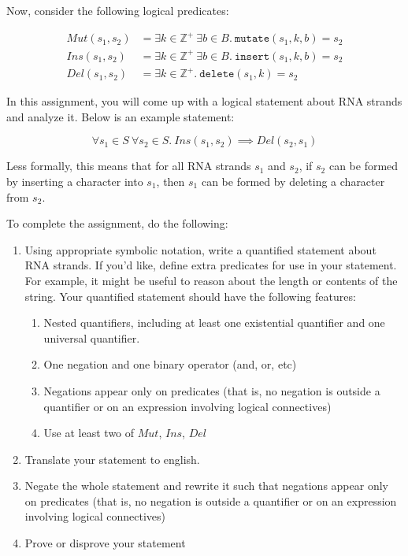 \documentclass[12pt]{article}
\begin{document}
Now, consider the following logical predicates:

\begin{align*}
  Mut(s_1, s_2) &= \exists k \in \mathbb{Z}^+ \ \exists b \in B. \ \texttt{mutate}(s_1, k, b) = s_2\\
  Ins(s_1, s_2) &= \exists k \in \mathbb{Z}^+ \ \exists b \in B. \ \texttt{insert}(s_1, k, b) = s_2 \\
  Del(s_1, s_2) &= \exists k \in \mathbb{Z}^+. \ \texttt{delete}(s_1, k) = s_2
\end{align*}

In this assignment, you will come up with a logical statement about RNA strands
and analyze it. Below is an example statement:

\[ \forall s_1 \in S \ \forall s_2 \in S. \ Ins(s_1, s_2) \implies Del(s_2, s_1)  \]

Less formally, this means that for all RNA strands $s_1$ and $s_2$, if $s_2$ can
be formed by inserting a character into $s_1$, then $s_1$ can be formed by
deleting a character from $s_2$.

To complete the assignment, do the following:

\begin{enumerate}
  \item Using appropriate symbolic notation, write a quantified statement 
    about RNA strands. 
    If you'd like, define extra predicates for use in your statement.
    For example, it might be useful to reason about the length or contents of
    the string.
    Your quantified statement should have the following features:
    \begin{enumerate}
      \item Nested quantifiers, including at least one existential quantifier
        and one universal quantifier.
      \item One negation and one binary operator (and, or, etc)
      \item Negations appear only on predicates (that is, no negation is outside
        a quantifier or on an expression involving logical connectives)
      \item Use at least two of $Mut$, $Ins$, $Del$
    \end{enumerate}
  \item Translate your statement to english.
  \item Negate the whole statement and rewrite it such that negations appear
    only on predicates (that is, no negation is outside
    a quantifier or on an expression involving logical connectives)
  \item Prove or disprove your statement
\end{enumerate}
\end{document}
